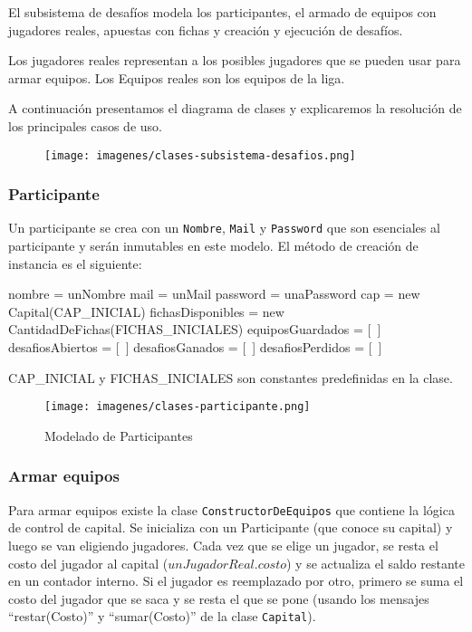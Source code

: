 El subsistema de desaf\'ios modela los participantes, el armado de equipos con jugadores reales, apuestas con fichas y creaci\'on y ejecuci\'on
de desaf\'ios.

Los jugadores reales representan a los posibles jugadores que se pueden usar para armar equipos. Los Equipos reales son los equipos de la liga.

A continuaci\'on presentamos el diagrama de clases y explicaremos la resoluci\'on de los principales casos de uso.

\newpage
\begin{landscape}

  \begin{figure}[h!]
   \texttt{[image: imagenes/clases-subsistema-desafios.png]}
   \caption{}
  \end{figure}

\end{landscape}
\newpage


\subsubsection{Participante}
Un participante se crea con un {\tt Nombre}, {\tt Mail} y {\tt Password} que son esenciales al participante y serán inmutables en este modelo.
El método de creación de instancia es el siguiente:

\begin{algorithmic}
	  \State nombre = unNombre
	  \State mail = unMail
	  \State password = unaPassword
	  \State cap = new Capital(CAP\_INICIAL)
	  \State fichasDisponibles = new CantidadDeFichas(FICHAS\_INICIALES)
	  \State equiposGuardados = [\ ]
	  \State desafiosAbiertos = [\ ]
	  \State desafiosGanados = [\ ]
	  \State desafiosPerdidos = [\ ]
	\EndFunction
\end{algorithmic}

CAP\_INICIAL y FICHAS\_INICIALES son constantes predefinidas en la clase.

\begin{figure}[h!]
   \texttt{[image: imagenes/clases-participante.png]}
   \caption{Modelado de Participantes}
\end{figure}

\subsubsection{Armar equipos}
Para armar equipos existe la clase {\tt ConstructorDeEquipos} que contiene la lógica de control de capital. Se inicializa con un Participante (que
conoce su capital) y luego se
van eligiendo jugadores. Cada vez que se elige un jugador, se resta el costo del jugador al capital ($unJugadorReal.costo$) y se actualiza el saldo
restante en un contador interno. Si el jugador
es reemplazado por otro, primero se suma el costo del jugador que se saca y se resta el que se pone (usando los mensajes ``restar(Costo)'' y ``sumar(Costo)''
de la clase {\tt Capital}).

